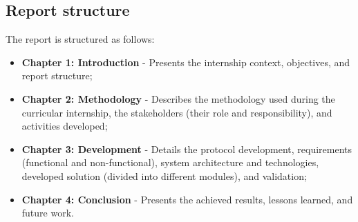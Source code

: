 \subsection{Report structure}
The report is structured as follows:
\begin{itemize}
    \item \textbf{Chapter 1: Introduction} - Presents the internship context, objectives, and report structure;
    \item \textbf{Chapter 2: Methodology} - Describes the methodology used during the curricular internship, the stakeholders (their role and responsibility), and activities developed;
    \item \textbf{Chapter 3: Development} - Details the protocol development, requirements (functional and non-functional), system architecture and technologies, developed solution (divided into different modules), and validation;
    \item \textbf{Chapter 4: Conclusion} - Presents the achieved results, lessons learned, and future work.
\end{itemize}